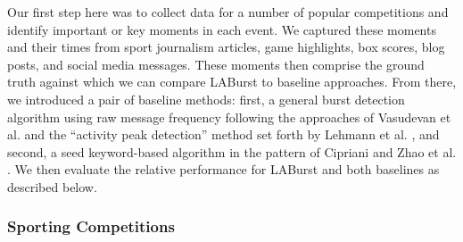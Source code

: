 \documentclass[letterpaper]{article}
\begin{document}
Our first step here was to collect data for a number of popular competitions and identify important or key moments in each event.
We captured these moments and their times from sport journalism articles, game highlights, box scores, blog posts, and social media messages.
These moments then comprise the ground truth against which we can compare LABurst to baseline approaches.
From there, we introduced a pair of baseline methods: first, a general burst detection algorithm using raw message frequency following the approaches of Vasudevan et al. and the ``activity peak detection'' method set forth by Lehmann et al. \cite{vasudevan2013twitter,Lehmann:2012:DCC:2187836.2187871}, and second, a seed keyword-based algorithm in the pattern of Cipriani and Zhao et al. \cite{Cipriani2014,Zhao2011}.
We then evaluate the relative performance for LABurst and both baselines as described below.

\subsubsection{Sporting Competitions}
\end{document}
